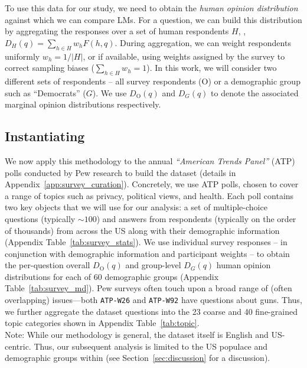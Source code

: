 To use this data for our study, we need to obtain the \emph{human opinion distribution} against which we can compare LMs.
For a question, we can build this distribution by aggregating the responses over a set of human respondents $H$, \ie, $D_H(q) = \sum_{h \in H} w_h F(h, q)$.
During aggregation, we can weight respondents uniformly $w_h = 1/|H|$, or if available, using weights assigned by the survey to correct sampling biases ($\sum_{h \in H} w_h = 1$).
In this work, we will consider two different sets of respondents -- all survey respondents (O) or a demographic group such as ``Democrats'' ($G$).
We use $D_\text{O}(q)$ and $D_G(q)$ to denote the associated marginal opinion distributions respectively.

\subsection{Instantiating \bname} 
We now apply this methodology to the annual \emph{``American Trends Panel''} (ATP) polls conducted by Pew research to build the \bname dataset (details in Appendix~\ref{app:survey_curation}).
Concretely, we use \nsurveys{} ATP polls, chosen to cover a range of topics such as privacy, political views, and health.
Each poll contains two key objects that we will use for our analysis: a set of multiple-choice questions (typically $\sim 100$) and answers from respondents (typically on the order of thousands) from across the US along with their demographic information (Appendix Table~\ref{tab:survey_stats}).
We use individual survey responses -- in conjunction with demographic information and participant weights -- to obtain the per-question overall $D_{
  \text{O}}(q)$ and group-level $D_G(q)$ human opinion distributions for each of 60 demographic groups (Appendix Table~\ref{tab:survey_md}).
Pew surveys often touch upon a broad range of (often overlapping) issues---both \texttt{ATP-W26} and \texttt{ATP-W92} have questions about guns.
Thus, we further aggregate the dataset questions into the 23 coarse and 40 fine-grained topic categories shown in Appendix Table~\ref{tab:topic}.  \\

\noindent Note: While our methodology is general, the \bname dataset itself is English and US-centric. Thus, our subsequent analysis is limited to the US populace and demographic groups within (see Section~\ref{sec:discussion} for a discussion).





